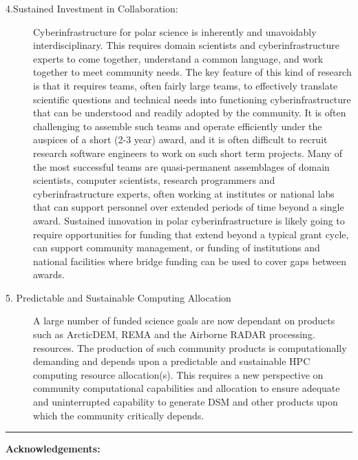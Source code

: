 \documentclass[10pt,letterpaper,draft]{article}
\begin{document}
\begin{description}
\item[4.Sustained Investment in Collaboration:]
Cyberinfrastructure for polar science is inherently and unavoidably interdisciplinary. This requires domain scientists and cyberinfrastructure experts to come together, understand a common language, and work together to meet community needs. The key feature of this kind of research is that it requires teams, often fairly large teams, to effectively translate scientific questions and technical needs into functioning cyberinfrastructure that can be understood and readily adopted by the community. It is often challenging to assemble such teams and operate efficiently under the auspices of a short (2-3 year) award, and it is often difficult to recruit research software engineers to work on such short term projects. Many of the most successful teams are quasi-permanent assemblages of domain scientists, computer scientists, research programmers and cyberinfrastructure experts, often working at institutes or national labs that can support personnel over extended periods of time beyond a single award. Sustained innovation in polar cyberinfrastructure is likely going to require opportunities for funding that extend beyond a typical grant cycle, can support community management, or funding of institutions and national facilities where bridge funding can be used to cover gaps between awards. 

\item[ 5. Predictable and Sustainable Computing Allocation]
A large number of funded science goals are now dependant on products such as ArcticDEM, REMA and the Airborne RADAR processing.  resources.   The production of such community products is computationally demanding and depends upon a predictable and sustainable HPC computing resource allocation(s). This requires a new perspective on community computational capabilities and allocation to ensure adequate and uninterrupted capability to generate DSM and other products upon which the community critically depends. 

\end{description}



\hspace{1.5cm}\rule{13.0cm}{0.8pt}

\vspace{0.5cm}

{\noindent \bf \small Acknowledgements:} 




\end{document}

